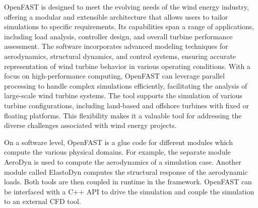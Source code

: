 OpenFAST is designed to meet the evolving needs of the wind energy industry, offering a modular and extensible architecture that allows users to tailor simulations to specific requirements. Its capabilities span a range of applications, including load analysis, controller design, and overall turbine performance assessment. The software incorporates advanced modeling techniques for aerodynamics, structural dynamics, and control systems, ensuring accurate representation of wind turbine behavior in various operating conditions. With a focus on high-performance computing, OpenFAST can leverage parallel processing to handle complex simulations efficiently, facilitating the analysis of large-scale wind turbine systems. The tool supports the simulation of various turbine configurations, including land-based and offshore turbines with fixed or floating platforms. This flexibility makes it a valuable tool for addressing the diverse challenges associated with wind energy projects.

On a software level, OpenFAST is a glue code for different modules which compute the various physical domains. For example, the separate module AeroDyn is used to compute the aerodynamics of a simulation case. Another module called ElastoDyn computes the structural response of the aerodynamic loads. Both tools are then coupled in runtime in the framework. OpenFAST can be interfaced with a C++ API to drive the simulation and couple the simulation to an external CFD tool.


